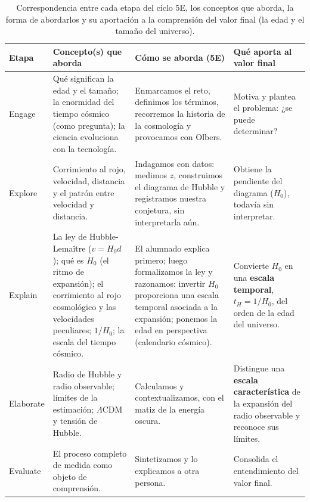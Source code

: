 \begin{table}[htbp]
\centering
\caption{Correspondencia entre cada etapa del ciclo 5E, los conceptos que aborda, la forma de abordarlos y su aportación a la comprensión del valor final (la edad y el tamaño del universo).}\label{tab:correspondencia}
\begin{tabularx}{\textwidth}{|>{\raggedright\arraybackslash}p{1.7cm}|>{\raggedright\arraybackslash}X|>{\raggedright\arraybackslash}X|>{\raggedright\arraybackslash}X|}
\hline
\rowcolor{naranja}
{\color{white}\textbf{Etapa}} & {\color{white}\textbf{Concepto(s) que aborda}} & {\color{white}\textbf{Cómo se aborda (5E)}} & {\color{white}\textbf{Qué aporta al valor final}} \\ \hline
Engage & Qué significan la edad y el tamaño; la enormidad del tiempo cósmico (como pregunta); la ciencia evoluciona con la tecnología. & Enmarcamos el reto, definimos los términos, recorremos la historia de la cosmología y provocamos con Olbers. & Motiva y plantea el problema: ¿se puede determinar? \\ \hline
Explore & Corrimiento al rojo, velocidad, distancia y el patrón entre velocidad y distancia. & Indagamos con datos: medimos $z$, construimos el diagrama de Hubble y registramos nuestra conjetura, sin interpretarla aún. & Obtiene la pendiente del diagrama ($H_{0}$), todavía sin interpretar. \\ \hline
Explain & La ley de Hubble-Lemaître ($v = H_{0}d$); qué es $H_{0}$ (el ritmo de expansión); el corrimiento al rojo cosmológico y las velocidades peculiares; $1/H_{0}$; la escala del tiempo cósmico. & El alumnado explica primero; luego formalizamos la ley y razonamos: invertir $H_{0}$ proporciona una escala temporal asociada a la expansión; ponemos la edad en perspectiva (calendario cósmico). & Convierte $H_{0}$ en una \textbf{escala temporal}, $t_H=1/H_0$, del orden de la edad del universo. \\ \hline
Elaborate & Radio de Hubble y radio observable; límites de la estimación; $\Lambda$CDM y tensión de Hubble. & Calculamos y contextualizamos, con el matiz de la energía oscura. & Distingue una \textbf{escala característica} de la expansión del radio observable y reconoce sus límites. \\ \hline
Evaluate & El proceso completo de medida como objeto de comprensión. & Sintetizamos y lo explicamos a otra persona. & Consolida el entendimiento del valor final. \\ \hline
\end{tabularx}
\end{table}

